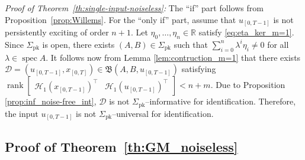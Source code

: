 \documentclass[journal,twoside,web]{ieeecolor}
\DeclareMathOperator{\rank}{rank}
\DeclareMathOperator{\spec}{spec}
\begin{document}
\textit{Proof of Theorem~\ref{th:single-input-noiseless}:} The ``if'' part follows from Proposition~\ref{prop:Willems}. For the ``only if'' part, assume that $u_{[0,T-1]}$ is not persistently exciting of order $n+1$. Let $\eta_0,\ldots,\eta_n\in\mathbb{R}$ satisfy \eqref{eq:eta_ker_m=1}. Since $\Sigma_\text{pk}$ is open, there exists $(A,B)\in\Sigma_\text{pk}$ such that $\sum_{i=0}^n \lambda^i \eta_i\neq 0$ for all $\lambda\in\spec A$. It follows now from Lemma \ref{lem:contruction_m=1} that there exists \mbox{$\mathcal{D}=(u_{[0,T-1]},x_{[0,T]})\in\mathfrak{B}(A,B,u_{[0,T-1]})$} satisfying $\rank \begin{bmatrix}
\mathcal{H}_1(x_{[0,T-1]})^\top & \mathcal{H}_1(u_{[0,T-1]})^\top
\end{bmatrix}<n+m$. Due to Proposition \ref{prop:inf_noise-free_int}, $\mathcal{D}$ is not \mbox{$\Sigma_\text{pk}$--informative} for identification. Therefore, the input $u_{[0,T-1]}$ is not \mbox{$\Sigma_\text{pk}$--universal} for identification. \hfill \QED

\subsection{Proof of Theorem~\ref{th:GM_noiseless}}
\end{document}
